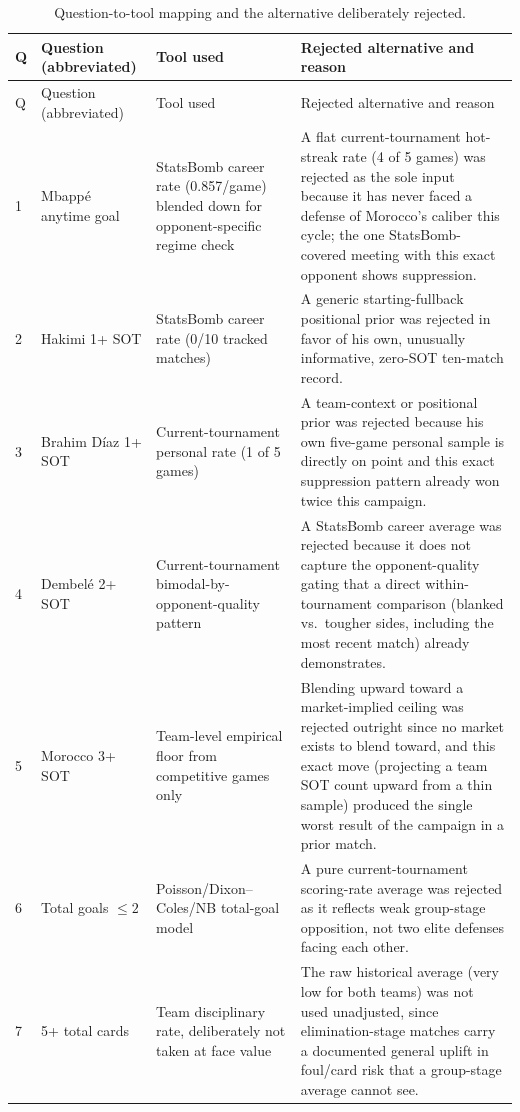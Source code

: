 \documentclass[11pt]{article}
\begin{document}
\begin{longtable}{p{1.6cm}p{4.6cm}p{3.0cm}p{5.0cm}}
\caption{Question-to-tool mapping and the alternative deliberately rejected.} \label{tab:mapping} \\
\toprule
Q & Question (abbreviated) & Tool used & Rejected alternative and reason \\
\midrule
\endfirsthead
\toprule
Q & Question (abbreviated) & Tool used & Rejected alternative and reason \\
\midrule
\endhead
1 & Mbapp\'e anytime goal & StatsBomb career rate (0.857/game) blended down for opponent-specific regime check & A flat current-tournament hot-streak rate (4 of 5 games) was rejected as the sole input because it has never faced a defense of Morocco's caliber this cycle; the one StatsBomb-covered meeting with this exact opponent shows suppression. \\
2 & Hakimi 1+ SOT & StatsBomb career rate (0/10 tracked matches) & A generic starting-fullback positional prior was rejected in favor of his own, unusually informative, zero-SOT ten-match record. \\
3 & Brahim D\'iaz 1+ SOT & Current-tournament personal rate (1 of 5 games) & A team-context or positional prior was rejected because his own five-game personal sample is directly on point and this exact suppression pattern already won twice this campaign. \\
4 & Dembel\'e 2+ SOT & Current-tournament bimodal-by-opponent-quality pattern & A StatsBomb career average was rejected because it does not capture the opponent-quality gating that a direct within-tournament comparison (blanked vs.\ tougher sides, including the most recent match) already demonstrates. \\
5 & Morocco 3+ SOT & Team-level empirical floor from competitive games only & Blending upward toward a market-implied ceiling was rejected outright since no market exists to blend toward, and this exact move (projecting a team SOT count upward from a thin sample) produced the single worst result of the campaign in a prior match. \\
6 & Total goals $\le 2$ & Poisson/Dixon--Coles/NB total-goal model & A pure current-tournament scoring-rate average was rejected as it reflects weak group-stage opposition, not two elite defenses facing each other. \\
7 & 5+ total cards & Team disciplinary rate, deliberately not taken at face value & The raw historical average (very low for both teams) was not used unadjusted, since elimination-stage matches carry a documented general uplift in foul/card risk that a group-stage average cannot see. \\

\end{longtable}
\end{document}
